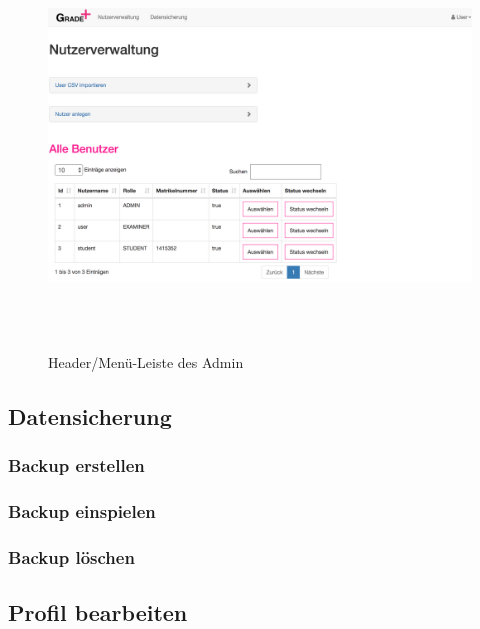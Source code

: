 \begin{figure}[H]
	\centering
	\caption{Header/Menü-Leiste des Admin}
  \includegraphics[width=\textwidth,height=10cm,keepaspectratio]{../screenshots/Admin/Nutzerverwaltung/nutzer1.png}
	\label{fig 2}
\end{figure}



\subsection{Datensicherung}
\label{datensicherung}

\subsubsection{Backup erstellen}
\subsubsection{Backup einspielen}
\subsubsection{Backup löschen}

\subsection{Profil  bearbeiten}
\label{profil}


